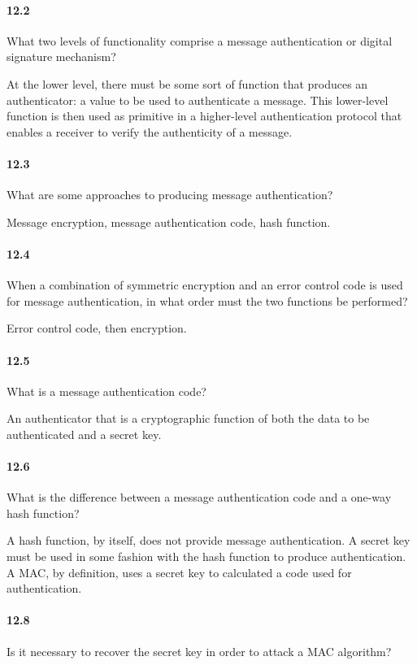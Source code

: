 \documentclass[UTF8]{article}
\begin{document}
\paragraph{12.2}
What two levels of functionality comprise a message authentication or digital signature mechanism?

At the lower level, there must be some sort of function that produces an authenticator: a value to be used to authenticate a message. This lower-level function is then used as primitive in a higher-level authentication protocol that enables a receiver to verify the authenticity of a message.
\paragraph{12.3}
What are some approaches to producing message authentication?

Message encryption, message authentication code, hash function.
\paragraph{12.4}
When a combination of symmetric encryption and an error control code is used for message authentication, in what order must the two functions be performed?

Error control code, then encryption.
\paragraph{12.5}
What is a message authentication code?

An authenticator that is a cryptographic function of both the data to be authenticated and a secret key.
\paragraph{12.6}
What is the difference between a message authentication code and a one-way hash function?

A hash function, by itself, does not provide message authentication. A secret key must be used in some fashion with the hash function to produce authentication. A MAC, by definition, uses a secret key to calculated a code used for authentication.
\paragraph{12.8}
Is it necessary to recover the secret key in order to attack a MAC algorithm?
\end{document}
